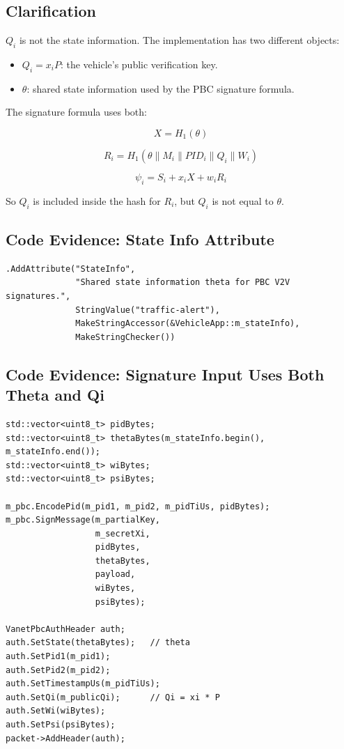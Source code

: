 \documentclass[11pt,a4paper]{article}
\begin{document}
\subsection{Clarification}

\(Q_i\) is not the state information. The implementation has two different
objects:

\begin{itemize}[leftmargin=*]
  \item \(Q_i=x_iP\): the vehicle's public verification key.
  \item \(\theta\): shared state information used by the PBC signature formula.
\end{itemize}

The signature formula uses both:

\[
  X = H_1(\theta)
\]

\[
  R_i = H_1(\theta \parallel M_i \parallel PID_i \parallel Q_i \parallel W_i)
\]

\[
  \psi_i = S_i + x_iX + w_iR_i
\]

So \(Q_i\) is included inside the hash for \(R_i\), but \(Q_i\) is not equal to
\(\theta\).

\subsection{Code Evidence: State Info Attribute}

\begin{lstlisting}[style=cppstyle,caption={Vehicle state info theta is a string attribute.}]
.AddAttribute("StateInfo",
              "Shared state information theta for PBC V2V signatures.",
              StringValue("traffic-alert"),
              MakeStringAccessor(&VehicleApp::m_stateInfo),
              MakeStringChecker())
\end{lstlisting}

\subsection{Code Evidence: Signature Input Uses Both Theta and Qi}

\begin{lstlisting}[style=cppstyle,caption={Vehicle signs using theta and sends Qi separately.}]
std::vector<uint8_t> pidBytes;
std::vector<uint8_t> thetaBytes(m_stateInfo.begin(), m_stateInfo.end());
std::vector<uint8_t> wiBytes;
std::vector<uint8_t> psiBytes;

m_pbc.EncodePid(m_pid1, m_pid2, m_pidTiUs, pidBytes);
m_pbc.SignMessage(m_partialKey,
                  m_secretXi,
                  pidBytes,
                  thetaBytes,
                  payload,
                  wiBytes,
                  psiBytes);

VanetPbcAuthHeader auth;
auth.SetState(thetaBytes);   // theta
auth.SetPid1(m_pid1);
auth.SetPid2(m_pid2);
auth.SetTimestampUs(m_pidTiUs);
auth.SetQi(m_publicQi);      // Qi = xi * P
auth.SetWi(wiBytes);
auth.SetPsi(psiBytes);
packet->AddHeader(auth);
\end{lstlisting}
\end{document}
